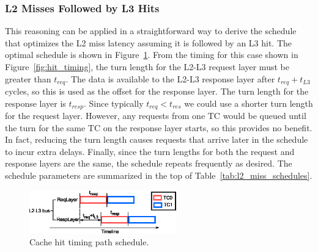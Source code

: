 \subsubsection{L2 Misses Followed by L3 Hits}
This reasoning can be applied in a straightforward way to derive the schedule 
that optimizes the L2 miss latency assuming it is followed by an L3 hit.
The optimal schedule is shown in Figure~\ref{fig:hit_schedule}.
From the timing for this case shown in Figure~\ref{fig:hit_timing}, the turn
length for the L2-L3 request layer must be greater than $t_{req}$. The 
data is available to the L2-L3 response layer after $t_{req}+t_{L3}$ cycles, so 
this is used as the offset for the response layer. The turn length for the 
response layer is $t_{resp}$. Since typically $t_{req}<t_{res}$ we could use a 
shorter turn length for the request layer. However, any requests from one TC 
would be queued until the turn for the same TC on the response layer starts, so 
this provides no benefit. In fact, reducing the turn length causes requests 
that arrive later in the schedule to incur extra delays. Finally, since the 
turn lengths for both the request and response layers are the same, the 
schedule repeats frequently as desired. The schedule parameters are summarized 
in the top of Table~\ref{tab:l2_miss_schedules}.

\begin{figure}
    \begin{center}
        \includegraphics[width=2.5in]{figs/hit_schedule.eps}
        \caption{Cache hit timing path schedule.}
        \label{fig:hit_schedule}
    \end{center}
\end{figure}


